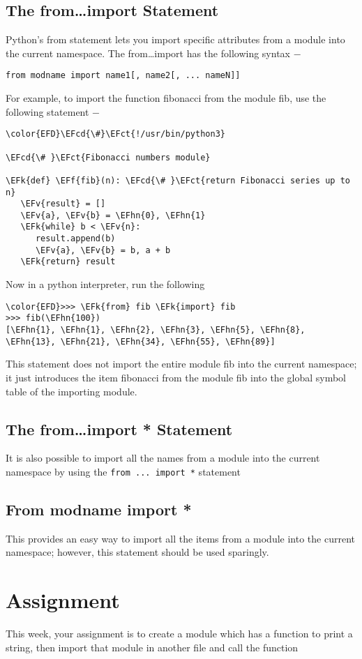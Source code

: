 \documentclass{scrartcl}
\newcommand{\EFk}[1]{\textcolor{EFk}{#1}} %
\newcommand{\EFct}[1]{\textcolor{EFct}{#1}} %
\newcommand{\EFv}[1]{\textcolor{EFv}{#1}} %
\newcommand{\EFf}[1]{\textcolor{EFf}{#1}} %
\newcommand{\EFcd}[1]{\textcolor{EFcd}{#1}} %
\newcommand{\EFhn}[1]{\textcolor{EFhn}{\textbf{#1}}} %
\begin{document}
\subsection{The from\ldots{}import Statement}
\label{sec:org4339722}
Python's from statement lets you import specific attributes from a module into the current namespace. The from\ldots{}import has the following syntax −

\texttt{from modname import name1[, name2[, ... nameN]]}

For example, to import the function fibonacci from the module fib, use the following statement −

\begin{Code}
\begin{Verbatim}[]
\color{EFD}\EFcd{\#}\EFct{!/usr/bin/python3}

\EFcd{\# }\EFct{Fibonacci numbers module}

\EFk{def} \EFf{fib}(n): \EFcd{\# }\EFct{return Fibonacci series up to n}
   \EFv{result} = []
   \EFv{a}, \EFv{b} = \EFhn{0}, \EFhn{1}
   \EFk{while} b < \EFv{n}:
      result.append(b)
      \EFv{a}, \EFv{b} = b, a + b
   \EFk{return} result
\end{Verbatim}
\end{Code}

Now in a python interpreter, run the following
\begin{Code}
\begin{Verbatim}[]
\color{EFD}>>> \EFk{from} fib \EFk{import} fib
>>> fib(\EFhn{100})
[\EFhn{1}, \EFhn{1}, \EFhn{2}, \EFhn{3}, \EFhn{5}, \EFhn{8}, \EFhn{13}, \EFhn{21}, \EFhn{34}, \EFhn{55}, \EFhn{89}]
\end{Verbatim}
\end{Code}

This statement does not import the entire module fib into the current namespace; it just introduces the item fibonacci from the module fib into the global symbol table of the importing module.

\subsection{The from\ldots{}import * Statement}
\label{sec:orgf0d7ae1}
It is also possible to import all the names from a module into the current
namespace by using the \texttt{from ... import *} statement

\subsection{From modname import *}
\label{sec:org7dd2ec5}
This provides an easy way to import all the items from a module into the current namespace; however, this statement should be used sparingly.

\section{Assignment}
\label{sec:org461e4d6}
This week, your assignment is to create a module which has a function to print a
string, then import that module in another file and call the function
\end{document}
